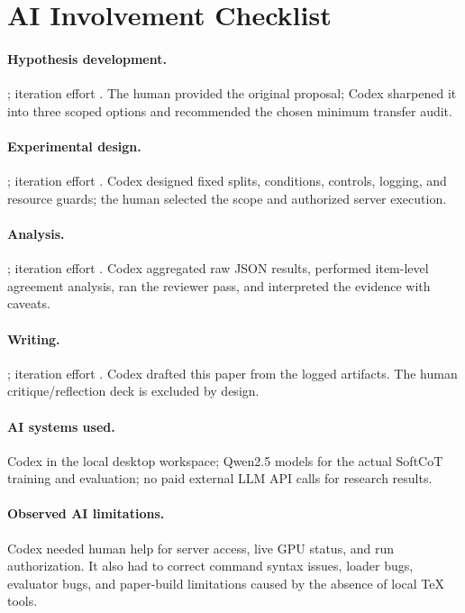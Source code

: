 \documentclass{article}
\begin{document}
\section{AI Involvement Checklist}
\label{checklist_ai_involvement}

\paragraph{Hypothesis development.} \involvementC{}; iteration effort \iterationMedium{}. The human provided the original proposal; Codex sharpened it into three scoped options and recommended the chosen minimum transfer audit.

\paragraph{Experimental design.} \involvementC{}; iteration effort \iterationMedium{}. Codex designed fixed splits, conditions, controls, logging, and resource guards; the human selected the scope and authorized server execution.

\paragraph{Analysis.} \involvementD{}; iteration effort \iterationMedium{}. Codex aggregated raw JSON results, performed item-level agreement analysis, ran the reviewer pass, and interpreted the evidence with caveats.

\paragraph{Writing.} \involvementD{}; iteration effort \iterationLow{}. Codex drafted this paper from the logged artifacts. The human critique/reflection deck is excluded by design.

\paragraph{AI systems used.} Codex in the local desktop workspace; Qwen2.5 models for the actual SoftCoT training and evaluation; no paid external LLM API calls for research results.

\paragraph{Observed AI limitations.} Codex needed human help for server access, live GPU status, and run authorization. It also had to correct command syntax issues, loader bugs, evaluator bugs, and paper-build limitations caused by the absence of local TeX tools.
\end{document}
